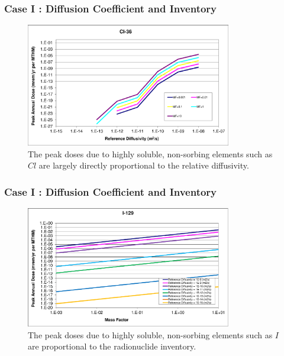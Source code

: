 \begin{frame}[c]
  \frametitle{Case I : Diffusion Coefficient and Inventory}
\begin{figure}[ht]
\centering
\includegraphics[width=0.8\textwidth]{DiffCoeffAndInvEBSFail/Cl-36.eps}
\caption{The peak doses due to highly soluble, non-sorbing elements such as $Cl$ 
are largely directly proportional to the relative diffusivity.  }
\label{fig:DCInvCl36}
\end{figure}
\end{frame}

\begin{frame}[c]
  \frametitle{Case I : Diffusion Coefficient and Inventory}
\begin{figure}[ht]
\centering
\includegraphics[width=0.8\textwidth]{DiffCoeffAndInvEBSFail/I-129-MF.eps}
\caption{The peak doses due to highly soluble, non-sorbing elements such as $I$ 
are  proportional to the radionuclide inventory.}
\label{fig:DCInvI129MF}
\end{figure}
\end{frame}

